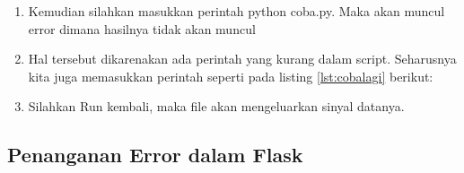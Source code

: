 \begin{enumerate}
\item Kemudian silahkan masukkan perintah python coba.py. Maka akan muncul error dimana hasilnya tidak akan muncul
\item Hal tersebut dikarenakan ada perintah yang kurang dalam script. Seharusnya kita juga memasukkan perintah seperti pada listing \ref{lst:cobalagi} berikut:

\item Silahkan Run kembali, maka file akan mengeluarkan sinyal datanya.
\end{enumerate}

\subsection{Penanganan Error dalam Flask}


